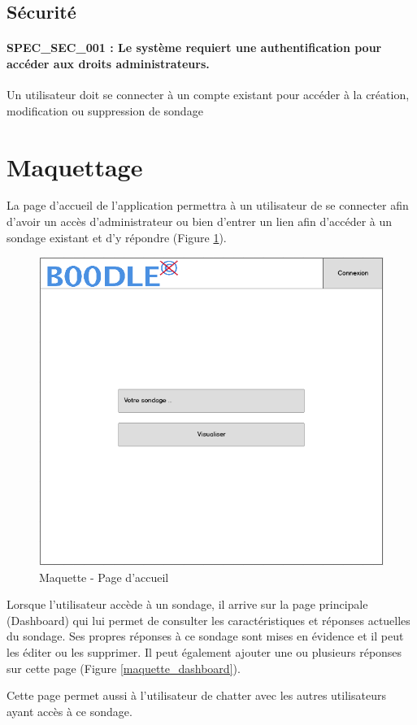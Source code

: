 \documentclass[titlepage]{report}
\begin{document}
\subsection{Sécurité}
\paragraph{SPEC\_SEC\_001 : Le système requiert une authentification pour accéder aux droits administrateurs.}
Un utilisateur doit se connecter à un compte existant pour accéder à la création, modification ou suppression de sondage

\section{Maquettage}

La page d'accueil de l'application permettra à un utilisateur de se connecter afin d'avoir un accès d'administrateur ou bien d'entrer un lien afin d'accéder à un sondage existant et d'y répondre (Figure \ref{maquette_accueil}).

\begin{figure}[h]
	\caption{Maquette - Page d'accueil}
	\label{maquette_accueil}
	\centering
	\includegraphics[scale=0.7]{figures/maquettes/accueil.png}
\end{figure}

\par Lorsque l'utilisateur accède à un sondage, il arrive sur la page principale (Dashboard) qui lui permet de consulter les caractéristiques et réponses actuelles du sondage. 
Ses propres réponses à ce sondage sont mises en évidence et il peut les éditer ou les supprimer. 
Il peut également ajouter une ou plusieurs réponses sur cette page (Figure \ref{maquette_dashboard}).
\par Cette page permet aussi à l'utilisateur de chatter avec les autres utilisateurs ayant accès à ce sondage.
\end{document}
